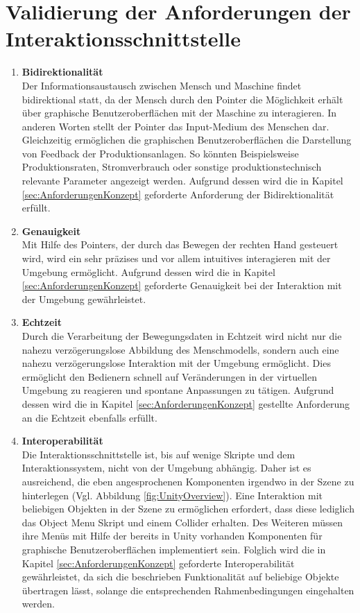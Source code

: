 \section{Validierung der Anforderungen der Interaktionsschnittstelle}\label{sec:ValidInteraktion}

\begin{enumerate}
	\item \textbf{Bidirektionalität} \\
	Der Informationsaustausch zwischen Mensch und Maschine findet bidirektional statt, da der Mensch durch den Pointer die Möglichkeit erhält über graphische Benutzeroberflächen mit der Maschine zu interagieren. In anderen Worten stellt der Pointer das Input-Medium des Menschen dar. Gleichzeitig ermöglichen die graphischen Benutzeroberflächen die Darstellung von Feedback der Produktionsanlagen. So könnten Beispielsweise Produktionsraten, Stromverbrauch oder sonstige produktionstechnisch relevante Parameter angezeigt werden. Aufgrund dessen wird die in Kapitel \ref{sec:AnforderungenKonzept} geforderte Anforderung der Bidirektionalität erfüllt.
	\item \textbf{Genauigkeit} \\
	Mit Hilfe des Pointers, der durch das Bewegen der rechten Hand gesteuert wird, wird ein sehr präzises und vor allem intuitives interagieren mit der Umgebung ermöglicht. Aufgrund dessen wird die in Kapitel \ref{sec:AnforderungenKonzept} geforderte Genauigkeit bei der Interaktion mit der Umgebung gewährleistet.
	\item \textbf{Echtzeit} \\
	Durch die Verarbeitung der Bewegungsdaten in Echtzeit wird nicht nur die nahezu verzögerungslose Abbildung des Menschmodells, sondern auch eine nahezu verzögerungslose Interaktion mit der Umgebung ermöglicht. Dies ermöglicht den Bedienern schnell auf Veränderungen in der virtuellen Umgebung zu reagieren und spontane Anpassungen zu tätigen. Aufgrund dessen wird die in Kapitel \ref{sec:AnforderungenKonzept} gestellte Anforderung an die Echtzeit ebenfalls erfüllt.
	\item \textbf{Interoperabilität} \\
	Die Interaktionsschnittstelle ist, bis auf wenige Skripte und dem Interaktionssystem, nicht von der Umgebung abhängig. Daher ist es ausreichend, die eben angesprochenen Komponenten irgendwo in der Szene zu hinterlegen (Vgl. Abbildung \ref{fig:UnityOverview}). Eine Interaktion mit beliebigen Objekten in der Szene zu ermöglichen erfordert, dass diese lediglich das Object Menu Skript und einem Collider erhalten. Des Weiteren müssen ihre Menüs mit Hilfe der bereits in Unity vorhanden Komponenten für graphische Benutzeroberflächen implementiert sein. Folglich wird die in Kapitel \ref{sec:AnforderungenKonzept} geforderte Interoperabilität gewährleistet, da sich die beschrieben Funktionalität auf beliebige Objekte übertragen lässt, solange die entsprechenden Rahmenbedingungen eingehalten werden.

\end{enumerate}

